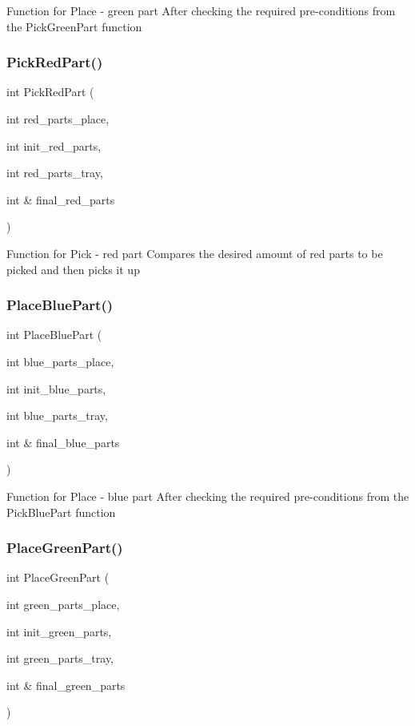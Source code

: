 Function for Place -\/ green part After checking the required pre-\/conditions from the Pick\+Green\+Part function \mbox{\label{main_8cpp_a9c022e99bef095cb6b7f6c08b05b229a}} 
\subsubsection{Pick\+Red\+Part()}
{\footnotesize\ttfamily int Pick\+Red\+Part (\begin{DoxyParamCaption}\item[{int}]{red\+\_\+parts\+\_\+place,  }\item[{int}]{init\+\_\+red\+\_\+parts,  }\item[{int}]{red\+\_\+parts\+\_\+tray,  }\item[{int \&}]{final\+\_\+red\+\_\+parts }\end{DoxyParamCaption})}

Function for Pick -\/ red part Compares the desired amount of red parts to be picked and then picks it up \mbox{\label{main_8cpp_a138194e6580474bfc3e9710ca290890b}} 
\subsubsection{Place\+Blue\+Part()}
{\footnotesize\ttfamily int Place\+Blue\+Part (\begin{DoxyParamCaption}\item[{int}]{blue\+\_\+parts\+\_\+place,  }\item[{int}]{init\+\_\+blue\+\_\+parts,  }\item[{int}]{blue\+\_\+parts\+\_\+tray,  }\item[{int \&}]{final\+\_\+blue\+\_\+parts }\end{DoxyParamCaption})}

Function for Place -\/ blue part After checking the required pre-\/conditions from the Pick\+Blue\+Part function \mbox{\label{main_8cpp_a8bb1951743e3ef30906e61d7bd493515}} 
\subsubsection{Place\+Green\+Part()}
{\footnotesize\ttfamily int Place\+Green\+Part (\begin{DoxyParamCaption}\item[{int}]{green\+\_\+parts\+\_\+place,  }\item[{int}]{init\+\_\+green\+\_\+parts,  }\item[{int}]{green\+\_\+parts\+\_\+tray,  }\item[{int \&}]{final\+\_\+green\+\_\+parts }\end{DoxyParamCaption})}

